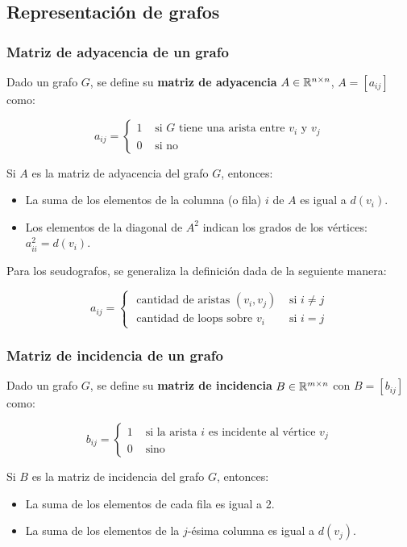 \subsection{Representación de grafos}
\subsubsection{Matriz de adyacencia de un grafo}
Dado un grafo \(G\), se define su \textbf{matriz de adyacencia} \(A\in\mathbb{R}^{n\times n}\), \(A = [a_{ij}]\) como:

\[a_{ij} = \begin{cases}
		1 & \text{ si } G \text{ tiene una arista entre } v_i \text{ y } v_j \\
		0 & \text{ si no }
	\end{cases}
\]

\begin{proposicion}
	Si \(A\) es la matriz de adyacencia del grafo \(G\), entonces:
	\begin{itemize}
		\item La suma de los elementos de la columna (o fila) \(i\) de \(A\) es igual a \(d(v_i)\).
		\item Los elementos de la diagonal de \(A^2\) indican los grados de los vértices: \(a_{ii}^2 = d(v_i)\).
	\end{itemize}
\end{proposicion}

Para los seudografos, se generaliza la definición dada de la seguiente manera:

\[a_{ij} = \begin{cases}
		\text{ cantidad de aristas }(v_i,v_j) & \text{ si } i \neq j \\
		\text{ cantidad de loops sobre } v_i  & \text{ si } i = j
	\end{cases}
\]

\subsubsection{Matriz de incidencia de un grafo}
Dado un grafo \(G\), se define su \textbf{matriz de incidencia} \(B\in\mathbb{R}^{m\times n}\) con \(B = [b_{ij}]\) como:

\[b_{ij} = \begin{cases}
		1 & \text{ si la arista } i \text{ es incidente al vértice } v_j \\
		0 & \text{ sino }
	\end{cases}\]

\begin{proposicion}
	Si \(B\) es la matriz de incidencia del grafo \(G\), entonces:
	\begin{itemize}
		\item La suma de los elementos de cada fila es igual a 2.
		\item La suma de los elementos de la \(j\)-ésima columna es igual a \(d(v_j)\).
	\end{itemize}
\end{proposicion}

